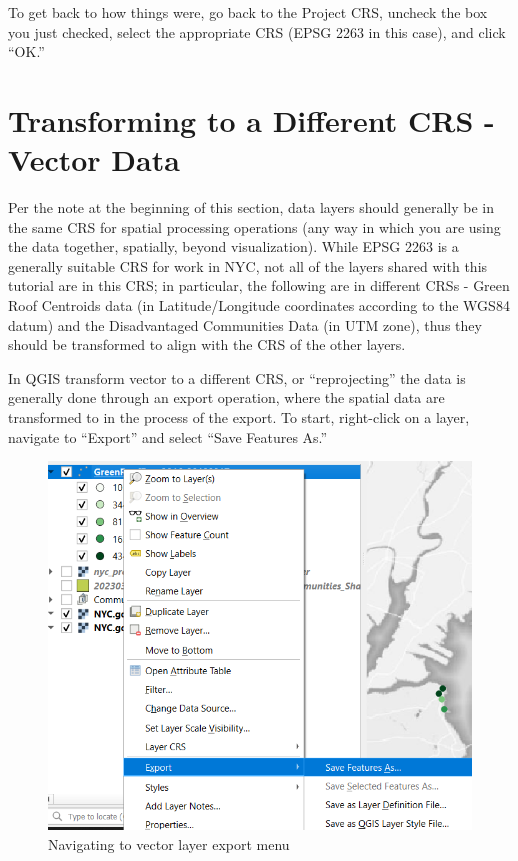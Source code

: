 \documentclass[
  letterpaper,
  DIV=11,
  numbers=noendperiod]{scrreprt}
\begin{document}
To get back to how things were, go back to the Project CRS, uncheck the
box you just checked, select the appropriate CRS (EPSG 2263 in this
case), and click ``OK.''

\hypertarget{transforming-to-a-different-crs---vector-data}{%
\section{Transforming to a Different CRS - Vector
Data}\label{transforming-to-a-different-crs---vector-data}}

Per the note at the beginning of this section, data layers should
generally be in the same CRS for spatial processing operations (any way
in which you are using the data together, spatially, beyond
visualization). While EPSG 2263 is a generally suitable CRS for work in
NYC, not all of the layers shared with this tutorial are in this CRS; in
particular, the following are in different CRSs - Green Roof Centroids
data (in Latitude/Longitude coordinates according to the WGS84 datum)
and the Disadvantaged Communities Data (in UTM zone), thus they should
be transformed to align with the CRS of the other layers.

In QGIS transform vector to a different CRS, or ``reprojecting'' the
data is generally done through an export operation, where the spatial
data are transformed to in the process of the export. To start,
right-click on a layer, navigate to ``Export'' and select ``Save
Features As.''

\begin{figure}

{\centering \includegraphics{./images/export_vector_1.png}

}

\caption{Navigating to vector layer export menu}

\end{figure}
\end{document}
